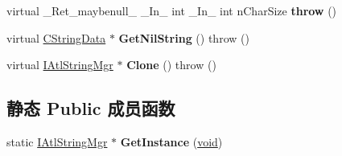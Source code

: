 \begin{DoxyCompactItemize}
virtual \+\_\+\+Ret\+\_\+maybenull\+\_\+ \+\_\+\+In\+\_\+ int \+\_\+\+In\+\_\+ int n\+Char\+Size {\bfseries throw} ()
\item 
\mbox{\label{class_a_t_l_1_1_c_atl_string_mgr_a3837a8314875750419806689ba8df792}} 
virtual \hyperlink{struct_a_t_l_1_1_c_string_data}{C\+String\+Data} $\ast$ {\bfseries Get\+Nil\+String} ()  throw ()
\item 
\mbox{\label{class_a_t_l_1_1_c_atl_string_mgr_a960037a39f106cbc4fa23c41fa241a05}} 
virtual \hyperlink{class_a_t_l_1_1_i_atl_string_mgr}{I\+Atl\+String\+Mgr} $\ast$ {\bfseries Clone} ()  throw ()
\end{DoxyCompactItemize}
\subsection*{静态 Public 成员函数}
\begin{DoxyCompactItemize}
\item 
\mbox{\label{class_a_t_l_1_1_c_atl_string_mgr_ab45b4406f0d0dab9277978e210dbbc91}} 
static \hyperlink{class_a_t_l_1_1_i_atl_string_mgr}{I\+Atl\+String\+Mgr} $\ast$ {\bfseries Get\+Instance} (\hyperlink{interfacevoid}{void})
\end{DoxyCompactItemize}
